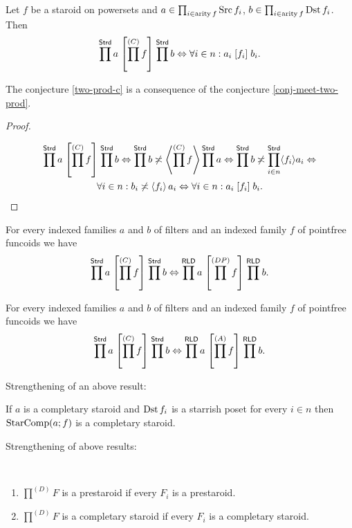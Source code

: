 \begin{conjecture}
\label{two-prod-c}Let $f$ be a staroid on powersets and $a\in\prod_{i\in\operatorname{arity} f}\operatorname{Src} f_{i}$,
$b\in\prod_{i\in\operatorname{arity} f}\operatorname{Dst} f_{i}$. Then 
\[
\prod^{\mathsf{Strd}}a\mathrel{\left[\prod^{(C)}f\right]}\prod^{\mathsf{Strd}}b\Leftrightarrow\forall i\in n:a_{i}\mathrel{\left[f_{i}\right]}b_{i}.
\]
\end{conjecture}
\begin{prop}
The conjecture \ref{two-prod-c} is a consequence of the conjecture
\ref{conj-meet-two-prod}.\end{prop}
\begin{proof}
~

\begin{multline*}
\prod^{\mathsf{Strd}}a\mathrel{\left[\prod^{(C)}f\right]}\prod^{\mathsf{Strd}}b\Leftrightarrow\prod^{\mathsf{Strd}}b\not\asymp\left\langle \prod^{(C)}f\right\rangle\prod^{\mathsf{Strd}}a\Leftrightarrow\prod^{\mathsf{Strd}}b\not\asymp\prod_{i\in n}^{\mathsf{Strd}}\langle f_{i}\rangle a_{i}\Leftrightarrow\\
\forall i\in n:b_{i}\not\asymp\left\langle f_{i}\right\rangle a_{i}\Leftrightarrow\forall i\in n:a_{i}\mathrel{\left[f_{i}\right]}b_{i}.
\end{multline*}
\end{proof}
\begin{conjecture}
For every indexed families $a$ and $b$ of filters and an indexed
family $f$ of pointfree funcoids we have 
\[
\prod^{\mathsf{Strd}}a\mathrel{\left[\prod^{(C)}f\right]}\prod^{\mathsf{Strd}}b\Leftrightarrow\prod^{\mathsf{RLD}}a\mathrel{\left[\prod^{(DP)}f\right]}\prod^{\mathsf{RLD}}b.
\]

\end{conjecture}

\begin{conjecture}
For every indexed families $a$ and $b$ of filters and an indexed
family $f$ of pointfree funcoids we have 
\[
\prod^{\mathsf{Strd}}a\mathrel{\left[\prod^{(C)}f\right]}\prod^{\mathsf{Strd}}b\Leftrightarrow\prod^{\mathsf{RLD}}a\mathrel{\left[\prod^{(A)}f\right]}\prod^{\mathsf{RLD}}b.
\]

\end{conjecture}
Strengthening of an above result:
\begin{conjecture}
If $a$ is a completary staroid and $\operatorname{Dst} f_{i}$ is a starrish poset
for every $i\in n$ then $\operatorname{StarComp}(a;f)$ is a completary staroid.
\end{conjecture}
Strengthening of above results:
\begin{conjecture}
~
\begin{enumerate}
\item $\prod^{(D)}F$ is a prestaroid if every $F_{i}$ is a prestaroid.
\item $\prod^{(D)}F$ is a completary staroid if every $F_{i}$ is a completary
staroid.
\end{enumerate}
\end{conjecture}

